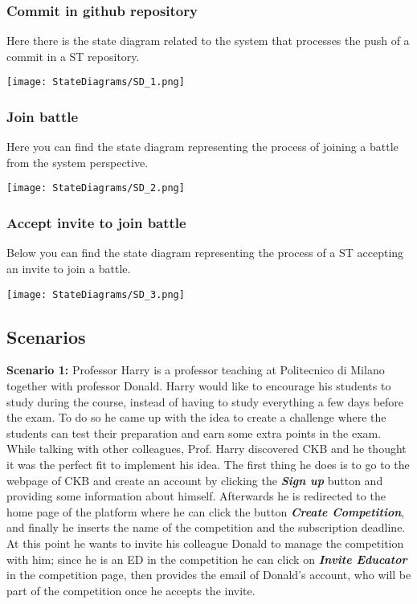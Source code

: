 \subsubsection*{Commit in github repository}
Here there is the state diagram related to the system that processes the push of a commit in a ST repository.
  \begin{center}
    \texttt{[image: StateDiagrams/SD\_1.png]}
  \end{center}
\newpage 
\subsubsection*{Join battle}
Here you can find the state diagram representing the process of joining a battle from the system perspective.
  \begin{center}
    \texttt{[image: StateDiagrams/SD\_2.png]}
  \end{center}

\subsubsection*{Accept invite to join battle}
Below you can find the state diagram representing the process of a ST accepting an invite to join a battle.
  \begin{center}
    \texttt{[image: StateDiagrams/SD\_3.png]}
  \end{center}

  
\subsection{Scenarios}
\label{ss:scenarios}%
\textbf{Scenario 1:} Professor Harry is a professor teaching at Politecnico di Milano together with professor Donald. Harry would like to encourage his students to study during the course, instead of having to study everything a few days before the exam. To do so he came up with the idea to create a challenge where the students can test their preparation and earn some extra points in the exam. While talking with other colleagues, Prof. Harry discovered CKB and he thought it was the perfect fit to implement his idea. The first thing he does is to go to the webpage of CKB and create an account by clicking the \textbf{\textit{Sign up}} button and providing some information about himself. Afterwards he is redirected to the home page of the platform where he can click the button \textbf{\textit{Create Competition}}, and finally he inserts the name of the competition and the subscription deadline. At this point he wants to invite his colleague Donald to manage the competition with him; since he is an ED in the competition he can click on \textbf{\textit{Invite Educator}} in the competition page, then provides the email of Donald's account, who will be part of the competition once he accepts the invite.



